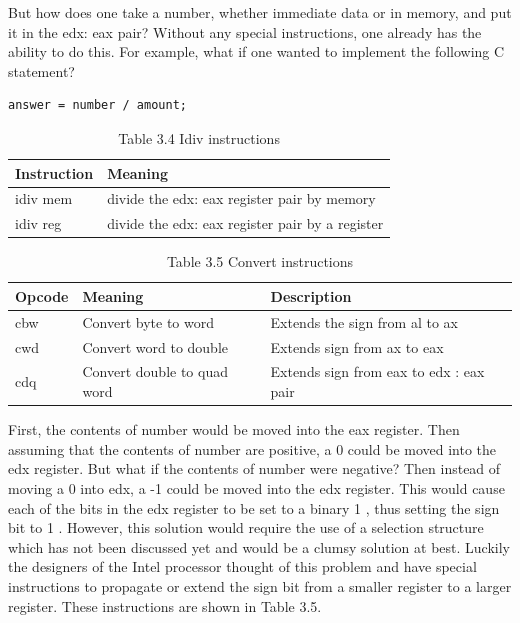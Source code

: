 \documentclass[10pt]{article}
\begin{document}
But how does one take a number, whether immediate data or in memory, and put it in the edx: eax pair? Without any special instructions, one already has the ability to do this. For example, what if one wanted to implement the following C statement?

\begin{verbatim}
answer = number / amount;
\end{verbatim}

\begin{table}[h]
\begin{center}
\captionsetup{labelformat=empty}
\caption{Table 3.4 Idiv instructions}
\begin{tabular}{|l|l|}
\hline
Instruction & Meaning \\
\hline
idiv mem & divide the edx: eax register pair by memory \\
\hline
idiv reg & divide the edx: eax register pair by a register \\
\hline
\end{tabular}
\end{center}
\end{table}

\begin{table}[h]
\begin{center}
\captionsetup{labelformat=empty}
\caption{Table 3.5 Convert instructions}
\begin{tabular}{|l|l|l|}
\hline
Opcode & Meaning & Description \\
\hline
cbw & Convert byte to word & Extends the sign from al to ax \\
\hline
cwd & Convert word to double & Extends sign from ax to eax \\
\hline
cdq & Convert double to quad word & Extends sign from eax to edx : eax pair \\
\hline
\end{tabular}
\end{center}
\end{table}

First, the contents of number would be moved into the eax register. Then assuming that the contents of number are positive, a 0 could be moved into the edx register. But what if the contents of number were negative? Then instead of moving a 0 into edx, a -1 could be moved into the edx register. This would cause each of the bits in the edx register to be set to a binary 1 , thus setting the sign bit to 1 . However, this solution would require the use of a selection structure which has not been discussed yet and would be a clumsy solution at best. Luckily the designers of the Intel processor thought of this problem and have special instructions to propagate or extend the sign bit from a smaller register to a larger register. These instructions are shown in Table 3.5.
\end{document}
